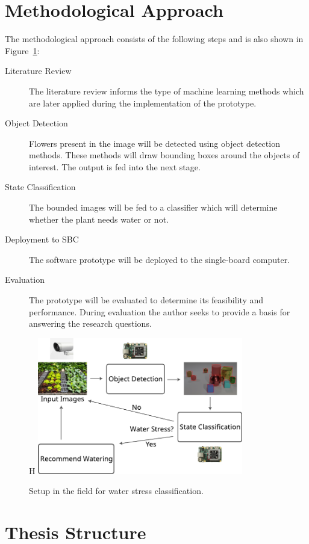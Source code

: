\documentclass[draft,final]{vutinfth} %
\begin{document}
\section{Methodological Approach}
\label{sec:methods}

The methodological approach consists of the following steps and is
also shown in Figure~\ref{fig:setup}:

\begin{description}
\item[Literature Review] The literature review informs the type of
  machine learning methods which are later applied during the
  implementation of the prototype.
\item[Object Detection] Flowers present in the image will be detected
  using object detection methods. These methods will draw bounding
  boxes around the objects of interest. The output is fed into the
  next stage.
\item[State Classification] The bounded images will be fed to a
  classifier which will determine whether the plant needs water or
  not.
\item[Deployment to SBC] The software prototype will be deployed to
  the single-board computer.
\item[Evaluation] The prototype will be evaluated to determine its
  feasibility and performance. During evaluation the author seeks to
  provide a basis for answering the research questions.
\end{description}

\begin{figure}{H}
  \centering
  \includegraphics[width=0.8\textwidth]{graphics/setup.pdf}
  \caption{Setup in the field for water stress classification.}
  \label{fig:setup}
\end{figure}

\section{Thesis Structure}
\label{sec:structure}
\end{document}
